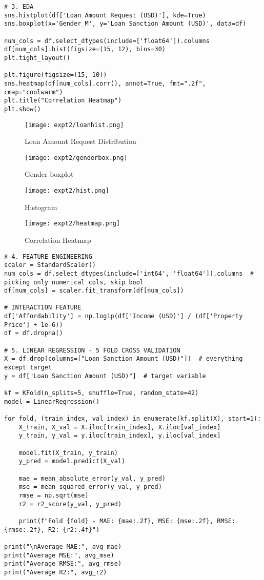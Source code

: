 \documentclass[11pt]{article}
\begin{document}
\begin{verbatim}
# 3. EDA
sns.histplot(df['Loan Amount Request (USD)'], kde=True)
sns.boxplot(x='Gender_M', y='Loan Sanction Amount (USD)', data=df)

num_cols = df.select_dtypes(include=['float64']).columns
df[num_cols].hist(figsize=(15, 12), bins=30)
plt.tight_layout()

plt.figure(figsize=(15, 10))
sns.heatmap(df[num_cols].corr(), annot=True, fmt=".2f", cmap="coolwarm")
plt.title("Correlation Heatmap")
plt.show()
\end{verbatim}

\begin{figure}[H]
\centering
\texttt{[image: expt2/loanhist.png]} 
\caption{Loan Amount Request Distribution}
\end{figure}

\begin{figure}[H]
\centering
\texttt{[image: expt2/genderbox.png]} 
\caption{Gender boxplot}
\end{figure}

\begin{figure}[H]
\centering
\texttt{[image: expt2/hist.png]} 
\caption{Histogram}
\end{figure}

\begin{figure}[H]
\centering
\texttt{[image: expt2/heatmap.png]} 
\caption{Correlation Heatmap}
\end{figure}

\begin{verbatim}
# 4. FEATURE ENGINEERING
scaler = StandardScaler()
num_cols = df.select_dtypes(include=['int64', 'float64']).columns  # picking only numerical cols, skip bool
df[num_cols] = scaler.fit_transform(df[num_cols])

# INTERACTION FEATURE
df['Affordability'] = np.log1p(df['Income (USD)'] / (df['Property Price'] + 1e-6))
df = df.dropna()

# 5. LINEAR REGRESSION - 5 FOLD CROSS VALIDATION
X = df.drop(columns=["Loan Sanction Amount (USD)"])  # everything except target
y = df["Loan Sanction Amount (USD)"]  # target variable

kf = KFold(n_splits=5, shuffle=True, random_state=42)
model = LinearRegression()

for fold, (train_index, val_index) in enumerate(kf.split(X), start=1):
    X_train, X_val = X.iloc[train_index], X.iloc[val_index]
    y_train, y_val = y.iloc[train_index], y.iloc[val_index]

    model.fit(X_train, y_train)
    y_pred = model.predict(X_val)

    mae = mean_absolute_error(y_val, y_pred)
    mse = mean_squared_error(y_val, y_pred)
    rmse = np.sqrt(mse)
    r2 = r2_score(y_val, y_pred)

    print(f"Fold {fold} - MAE: {mae:.2f}, MSE: {mse:.2f}, RMSE: {rmse:.2f}, R2: {r2:.4f}")

print("\nAverage MAE:", avg_mae)
print("Average MSE:", avg_mse)
print("Average RMSE:", avg_rmse)
print("Average R2:", avg_r2)
\end{verbatim}
\end{document}
